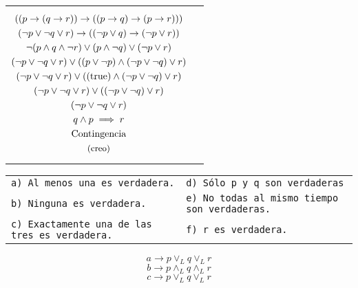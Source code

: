 \documentclass[10pt,a4paper,2in]{article}
\begin{document}
\begin{tabularx}{\linewidth}{X|X}
\begin{equation}
\begin{gathered}
            ((p\rightarrow(q\rightarrow r))\rightarrow ((p\rightarrow q)\rightarrow (p\rightarrow r)))\\
            (\lnot p \lor \lnot q \lor r) \rightarrow ((\lnot p \lor q)\rightarrow (\lnot p \lor r))\\
            \lnot (p\land q\land \lnot r )\lor (p\land \lnot q)\lor (\lnot p \lor r)\\
            (\lnot p\lor \lnot q\lor r )\lor ((p\lor \lnot p)\land (\lnot p \lor \lnot q)\lor r)\\
            (\lnot p\lor \lnot q\lor r )\lor ((\mathrm{true})\land (\lnot p \lor \lnot q)\lor r)\\
            (\lnot p\lor \lnot q\lor r )\lor ((\lnot p \lor \lnot q)\lor r)\\
            (\lnot p \lor \lnot q\lor r)\\
            q\land p \implies r
            \\\text{Contingencia}
            \\\text{\small(creo)}
        \end{gathered}
    \end{equation}
\end{tabularx}
\begin{tabularx}{\linewidth}{XX}
        \texttt{a) Al menos una es verdadera.} & \texttt{d) Sólo p y q son verdaderas}\\
        \texttt{b) Ninguna es verdadera.} & \texttt{e) No todas al mismo tiempo son verdaderas.}\\
        \texttt{c) Exactamente una de las tres es verdadera.} & \texttt{f) r es verdadera.}\\
\end{tabularx}
\begin{equation*}
    a\longrightarrow p\lor_L q \lor_L r
\end{equation*}
\begin{equation*}
    b\longrightarrow p\land_L q \land_L r
\end{equation*}
\begin{equation*}
    c\longrightarrow p\lor_L q \lor_L r
\end{equation*}
\end{document}
